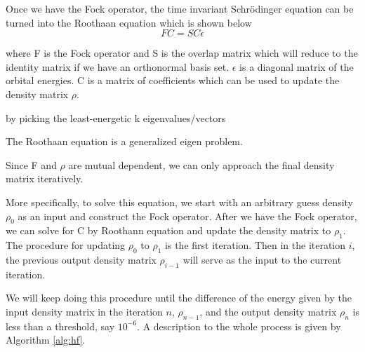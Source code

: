 \documentclass[twoside]{article}
\begin{document}
Once we have the Fock operator, the time invariant Schr\"{o}dinger equation can be turned into the Roothaan equation which is shown below
\[
FC = SC\epsilon
\]





where F is the Fock operator and S is the overlap matrix which will reduce to the identity matrix if we have an orthonormal basis set. $\epsilon$ is a diagonal matrix of the orbital energies. C is a matrix of coefficients which can be used to update the density matrix $\rho$.

by picking the least-energetic k eigenvalues/vectors


The Roothaan equation is a generalized eigen problem.


Since F and $\rho$ are mutual dependent, we can only approach the final density matrix iteratively.

More specifically, to solve this equation, 
we start with an arbitrary guess density $\rho_0$ as an input and construct the Fock operator. 
After we have the Fock operator, we can solve for C by Roothann equation and update the density matrix to $\rho_1$. The procedure for updating $\rho_0$ to $\rho_1$ is the first iteration. Then in the iteration $i$, the previous output density matrix $\rho_{i-1}$ will serve as the input to the current iteration.

We will keep doing this procedure until the difference of the energy given by the input density matrix in the iteration $n$, $\rho_{n-1}$,  and the output density matrix $\rho_n$ is less than a threshold, say $10^{-6}$.  A description to the whole process is given by Algorithm \ref{alg:hf}.


\end{document}

